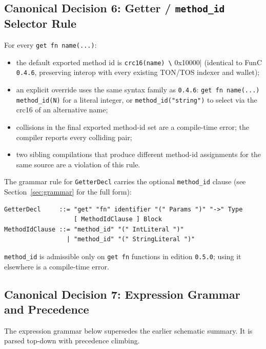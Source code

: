 \documentclass[12pt,oneside]{article}
\begin{document}
\subsection{Canonical Decision 6: Getter / \texttt{method\_id} Selector Rule}
\label{sec:cd-method-id}
For every \verb|get fn name(...)|:

\begin{itemize}
\item the default exported method id is
\verb|crc16(name) \| 0x10000| (identical to FunC \verb|0.4.6|, preserving
interop with every existing TON/TOS indexer and wallet);
\item an explicit override uses the same syntax family as
\verb|0.4.6|: \verb|get fn name(...) method_id(N)| for a literal integer, or
\verb|method_id("string")| to select via the crc16 of an alternative name;
\item collisions in the final exported method-id set are a compile-time
error; the compiler reports every colliding pair;
\item two sibling compilations that produce different method-id assignments
for the same source are a violation of this rule.
\end{itemize}

The grammar rule for \verb|GetterDecl| carries the optional
\verb|method_id| clause (see Section~\ref{sec:grammar} for the full
form):

\begin{verbatim}
GetterDecl     ::= "get" "fn" identifier "(" Params ")" "->" Type
                   [ MethodIdClause ] Block
MethodIdClause ::= "method_id" "(" IntLiteral ")"
                 | "method_id" "(" StringLiteral ")"
\end{verbatim}

\verb|method_id| is admissible only on \verb|get fn| functions in
edition \verb|0.5.0|; using it elsewhere is a compile-time error.

\subsection{Canonical Decision 7: Expression Grammar and Precedence}
\label{sec:cd-expr}
The expression grammar below supersedes the earlier schematic summary. It is
parsed top-down with precedence climbing.
\end{document}
